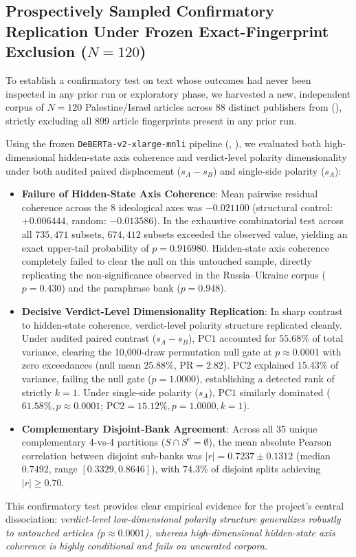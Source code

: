 \subsection{Prospectively Sampled Confirmatory Replication Under Frozen Exact-Fingerprint Exclusion ($N=120$)}
\label{sec:untouched_replication_results}

To establish a confirmatory test on text whose outcomes had never been inspected in any prior run or exploratory phase, we harvested a new, independent corpus of $N=120$ Palestine/Israel articles across 88 distinct publishers from  (), strictly excluding all 899 article fingerprints present in any prior run.

Using the frozen \texttt{DeBERTa-v2-xlarge-mnli} pipeline (, ), we evaluated both high-dimensional hidden-state axis coherence and verdict-level polarity dimensionality under both audited paired displacement ($s_A - s_B$) and single-side polarity ($s_A$):
\begin{itemize}
    \item \textbf{Failure of Hidden-State Axis Coherence}: Mean pairwise residual coherence across the 8 ideological axes was $-0.021100$ (structural control: $+0.006444$, random: $-0.013586$). In the exhaustive combinatorial test across all $735{,}471$ subsets, $674{,}412$ subsets exceeded the observed value, yielding an exact upper-tail probability of $p = 0.916980$. Hidden-state axis coherence completely failed to clear the null on this untouched sample, directly replicating the non-significance observed in the Russia--Ukraine corpus ($p = 0.430$) and the paraphrase bank ($p = 0.948$).
    \item \textbf{Decisive Verdict-Level Dimensionality Replication}: In sharp contrast to hidden-state coherence, verdict-level polarity structure replicated cleanly. Under audited paired contrast ($s_A - s_B$), $\mathrm{PC1}$ accounted for $55.68\%$ of total variance, clearing the 10,000-draw permutation null gate at $p \approx 0.0001$ with zero exceedances (null mean $25.88\%$, $\mathrm{PR} = 2.82$). $\mathrm{PC2}$ explained $15.43\%$ of variance, failing the null gate ($p = 1.0000$), establishing a detected rank of strictly $k=1$. Under single-side polarity ($s_A$), $\mathrm{PC1}$ similarly dominated ($61.58\%, p \approx 0.0001$; $\mathrm{PC2} = 15.12\%, p = 1.0000, k=1$).
    \item \textbf{Complementary Disjoint-Bank Agreement}: Across all 35 unique complementary 4-vs-4 partitions ($S \cap S^c = \emptyset$), the mean absolute Pearson correlation between disjoint sub-banks was $|r| = 0.7237 \pm 0.1312$ (median $0.7492$, range $[0.3329, 0.8646]$), with $74.3\%$ of disjoint splits achieving $|r| \geq 0.70$.
\end{itemize}
This confirmatory test provides clear empirical evidence for the project's central dissociation: \emph{verdict-level low-dimensional polarity structure generalizes robustly to untouched articles ($p \approx 0.0001$), whereas high-dimensional hidden-state axis coherence is highly conditional and fails on uncurated corpora.}

